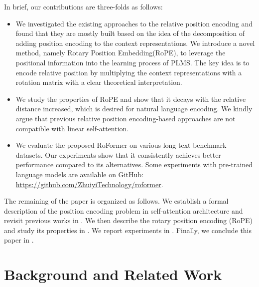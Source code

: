 \documentclass{article}
\begin{document}
In brief, our contributions are three-folds as follows:
\begin{itemize}
	\item We investigated the existing approaches to the relative position encoding and found that they are mostly built based on the idea of the decomposition of adding position encoding to the context representations. We introduce a novel method, namely Rotary Position Embedding(RoPE), to leverage the positional information into the learning process of PLMS. The key idea is  to encode relative position by multiplying the context representations with a rotation matrix with a clear theoretical interpretation.
	\item We study the properties of RoPE and show that it decays with the relative distance increased, which is desired for natural language encoding.  We kindly argue that previous relative position encoding-based approaches are not compatible with linear self-attention.
	
	\item We evaluate the proposed RoFormer on various long text benchmark datasets. Our experiments show that it consistently achieves better performance compared to its alternatives.  Some experiments with pre-trained language models are available on GitHub: \url{https://github.com/ZhuiyiTechnology/roformer}. 
\end{itemize}

The remaining of the paper is organized as follows. We establish a formal description of the position encoding problem in self-attention architecture and revisit previous works in . We then describe the rotary position encoding (RoPE) and study its properties in . We report experiments in . Finally, we conclude this paper in .

\section{Background and Related Work}\label{sec:background}
\end{document}
